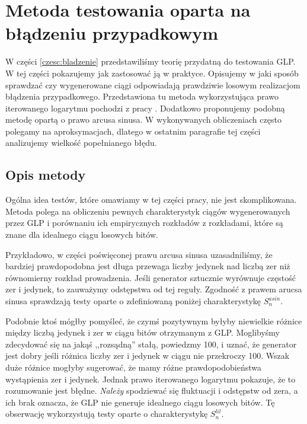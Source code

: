 \documentclass[a4paper,11pt,twoside]{book}
\newcommand{\Slil}[1]{S^{lil}_#1}
\newcommand{\Sasin}[1]{S^{asin}_#1}
\theoremstyle{definition}
\begin{document}
\chapter{Metoda testowania oparta na błądzeniu przypadkowym}
\label{czesc:metoda}
W części \ref{czesc:bladzenie} przedstawiliśmy teorię przydatną do testowania GLP. W tej części pokazujemy jak zastosować ją w praktyce. Opisujemy w jaki sposób sprawdzać czy wygenerowane ciągi odpowiadają prawdziwie losowym realizacjom błądzenia przypadkowego. Przedstawiona tu metoda wykorzystująca prawo iterowanego logarytmu pochodzi z pracy \cite{wang-nic}. Dodatkowo proponujemy podobną metodę opartą o prawo arcusa sinusa. W wykonywanych obliczeniach często polegamy na aproksymacjach, dlatego w ostatnim paragrafie tej części analizujemy wielkość popełnianego błędu.



\section{Opis metody}

Ogólna idea testów, które omawiamy w tej części pracy, nie jest skomplikowana. Metoda polega na obliczeniu pewnych charakterystyk ciągów wygenerowanych przez GLP i porównaniu ich empirycznych rozkładów z rozkładami, które są znane dla idealnego ciągu losowych bitów.

Przykładowo, w części poświęconej prawu arcusa sinusa uzasadniliśmy, że bardziej prawdopodobna jest długa przewaga liczby jedynek nad liczbą zer niż równomierny rozkład prowadzenia. Jeśli generator sztucznie wyrównuje częstość zer i jedynek, to zauważymy odstępstwa od tej reguły. Zgodność z prawem arucsa sinusa sprawdzają testy oparte o zdefiniowaną poniżej charakterystykę $\Sasin{n}$.

Podobnie ktoś mógłby pomyśleć, że czymś pozytywnym byłyby niewielkie różnice między liczbą jedynek i zer w ciągu bitów otrzymanym z GLP. Moglibyśmy zdecydować się na jakąś ,,rozsądną'' stałą, powiedzmy 100, i uznać, że generator jest dobry jeśli różnica liczby zer i jedynek w ciągu nie przekroczy 100. Wszak duże różnice mogłyby sugerować, że mamy różne prawdopodobieństwa wystąpienia zer i jedynek. Jednak prawo iterowanego logarytmu pokazuje, że to rozumowanie jest błędne. \emph{Należy} spodziewać się fluktuacji i odstępstw od zera, a ich brak oznacza, że GLP nie generuje idealnego ciągu losowych bitów. Tę obserwację wykorzystują testy oparte o charakterystykę $\Slil{n}$.
\end{document}
